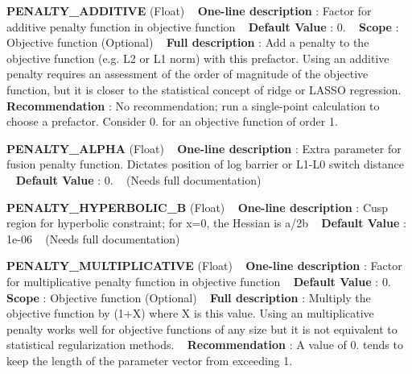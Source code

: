 \begin{DoxyItemize}
\item {\bfseries  P\+E\+N\+A\+L\+T\+Y\+\_\+\+A\+D\+D\+I\+T\+I\+VE } (Float) ~\newline
{\bfseries  One-\/line description }\+: Factor for additive penalty function in objective function ~\newline
{\bfseries  Default Value }\+: 0. ~\newline
{\bfseries  Scope }\+: Objective function (Optional) ~\newline
{\bfseries  Full description }\+: Add a penalty to the objective function (e.\+g. L2 or L1 norm) with this prefactor. Using an additive penalty requires an assessment of the order of magnitude of the objective function, but it is closer to the statistical concept of ridge or L\+A\+S\+SO regression. ~\newline
{\bfseries  Recommendation }\+: No recommendation; run a single-\/point calculation to choose a prefactor. Consider 0. for an objective function of order 1.\end{DoxyItemize}
\begin{DoxyItemize}
\item {\bfseries  P\+E\+N\+A\+L\+T\+Y\+\_\+\+A\+L\+P\+HA } (Float) ~\newline
{\bfseries  One-\/line description }\+: Extra parameter for fusion penalty function. Dictates position of log barrier or L1-\/\+L0 switch distance ~\newline
{\bfseries  Default Value }\+: 0. ~\newline
(Needs full documentation)\end{DoxyItemize}
\begin{DoxyItemize}
\item {\bfseries  P\+E\+N\+A\+L\+T\+Y\+\_\+\+H\+Y\+P\+E\+R\+B\+O\+L\+I\+C\+\_\+B } (Float) ~\newline
{\bfseries  One-\/line description }\+: Cusp region for hyperbolic constraint; for x=0, the Hessian is a/2b ~\newline
{\bfseries  Default Value }\+: 1e-\/06 ~\newline
(Needs full documentation)\end{DoxyItemize}
\begin{DoxyItemize}
\item {\bfseries  P\+E\+N\+A\+L\+T\+Y\+\_\+\+M\+U\+L\+T\+I\+P\+L\+I\+C\+A\+T\+I\+VE } (Float) ~\newline
{\bfseries  One-\/line description }\+: Factor for multiplicative penalty function in objective function ~\newline
{\bfseries  Default Value }\+: 0. ~\newline
{\bfseries  Scope }\+: Objective function (Optional) ~\newline
{\bfseries  Full description }\+: Multiply the objective function by (1+X) where X is this value. Using an multiplicative penalty works well for objective functions of any size but it is not equivalent to statistical regularization methods. ~\newline
{\bfseries  Recommendation }\+: A value of 0. tends to keep the length of the parameter vector from exceeding 1.\end{DoxyItemize}
